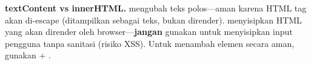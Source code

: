 \begin{catatan}
\textbf{textContent vs innerHTML.}  mengubah teks polos---aman karena HTML tag akan di-escape (ditampilkan sebagai teks, bukan dirender).  menyisipkan HTML yang akan dirender oleh browser---\textbf{jangan} gunakan untuk menyisipkan input pengguna tanpa sanitasi (risiko XSS). Untuk menambah elemen secara aman, gunakan  +  \cite{owaspXss}.
\end{catatan}

